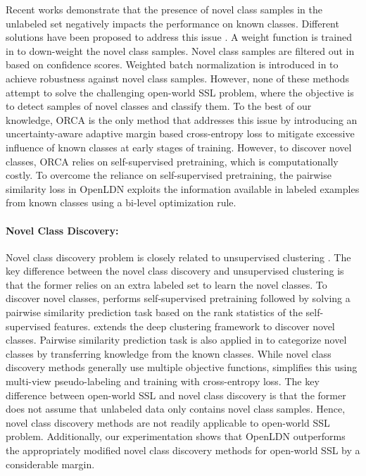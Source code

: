 \documentclass[runningheads]{eccv2022submission}
\begin{document}
Recent works \cite{oliver2018realistic,chen2020semi} demonstrate that the presence of novel class samples in the unlabeled set negatively impacts the performance on known classes. Different solutions have been proposed to address this issue \cite{guo2020safe,chen2020semi,zhao2020robust}. A weight function is trained in \cite{guo2020safe} to down-weight the novel class samples. Novel class samples are filtered out in \cite{chen2020semi} based on confidence scores. Weighted batch normalization is introduced in \cite{zhao2020robust} to achieve robustness against novel class samples. However, none of these methods attempt to solve the challenging open-world SSL problem, where the objective is to detect samples of novel classes and classify them. To the best of our knowledge, ORCA \cite{cao2022openworld} is the only method that addresses this issue by introducing an uncertainty-aware adaptive margin based cross-entropy loss to mitigate excessive influence of known classes at early stages of training. However, to discover novel classes, ORCA relies on self-supervised pretraining, which is computationally costly. To overcome the reliance on self-supervised pretraining, the pairwise similarity loss in OpenLDN exploits the information available in labeled examples from known classes using a bi-level optimization rule.

\vspace{-2mm}
\paragraph{\textbf{Novel Class Discovery:}}
Novel class discovery problem \cite{han2019learning,Han2020Automatically,hsu2018multiclass,hsu2018learning,fini2021unified,zhong2021openmix,zhao2021novel,zhong2021neighborhood,jia2021joint} is closely related to unsupervised clustering \cite{yang2016joint,yang2017towards,xie2016unsupervised,van2020scan}. The key difference between the novel class discovery and unsupervised clustering is that the former relies on an extra labeled set to learn the novel classes. To discover novel classes, \cite{Han2020Automatically} performs self-supervised pretraining followed by solving a pairwise similarity prediction task based on the rank statistics of the self-supervised features. \cite{han2019learning} extends the deep clustering framework to discover novel classes. Pairwise similarity prediction task is also applied in   \cite{hsu2018multiclass,hsu2018learning} to categorize novel classes by transferring knowledge from the known classes. While novel class discovery methods generally use multiple objective functions, \cite{fini2021unified} simplifies this using multi-view pseudo-labeling and training with cross-entropy loss. The key difference between open-world SSL and novel class discovery is that the former does not assume that unlabeled data only contains novel class samples. Hence, novel class discovery methods are not readily applicable to open-world SSL problem. Additionally, our experimentation shows that OpenLDN outperforms the appropriately modified novel class discovery methods for open-world SSL by a considerable margin.   
\end{document}

